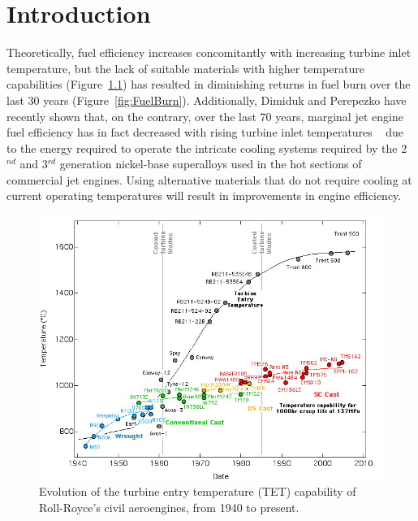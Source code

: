 \chapter{Introduction}\label{sec:intro}
Theoretically, fuel efficiency increases concomitantly with increasing turbine inlet temperature, but the lack of suitable materials with higher temperature capabilities (Figure~\ref{fig:TET}) has resulted in diminishing returns in fuel burn over the last 30 years (Figure~\ref{fig:FuelBurn}). Additionally, Dimiduk and Perepezko have recently shown that, on the contrary, over the last 70 years, marginal jet engine fuel efficiency has in fact decreased with rising turbine inlet temperatures ~\cite{dimiduk03} due to the energy required to operate the intricate cooling systems required by the 2$^{nd}$ and 3$^{rd}$ generation nickel-base superalloys used in the hot sections of commercial jet engines.  Using alternative materials that do not require cooling at current operating temperatures will result in improvements in engine efficiency.
%
\begin{figure}[htbp]
\begin{center}
\includegraphics[width=\textwidth]{TET}
\caption{Evolution of the turbine entry temperature (TET) capability of Roll-Royce's civil aeroengines, from 1940 to present.}\label{fig:TET}
\end{center}
\end{figure}
%
